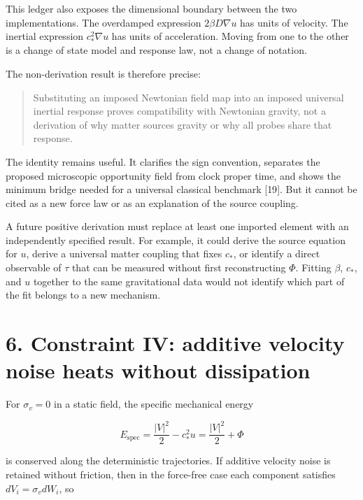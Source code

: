 \documentclass[
  american,
  11pt,
  letterpaper,
]{article}
\begin{document}
This ledger also exposes the dimensional boundary between the two implementations. The overdamped expression \(2\beta D\nabla u\) has units of velocity. The inertial expression \(c_*^2\nabla u\) has units of acceleration. Moving from one to the other is a change of state model and response law, not a change of notation.

The non-derivation result is therefore precise:

\begin{quote}
Substituting an imposed Newtonian field map into an imposed universal inertial response proves compatibility with Newtonian gravity, not a derivation of why matter sources gravity or why all probes share that response.
\end{quote}

The identity remains useful. It clarifies the sign convention, separates the proposed microscopic opportunity field from clock proper time, and shows the minimum bridge needed for a universal classical benchmark {[}19{]}. But it cannot be cited as a new force law or as an explanation of the source coupling.

A future positive derivation must replace at least one imported element with an independently specified result. For example, it could derive the source equation for \(u\), derive a universal matter coupling that fixes \(c_*\), or identify a direct observable of \(\tau\) that can be measured without first reconstructing \(\Phi\). Fitting \(\beta\), \(c_*\), and \(u\) together to the same gravitational data would not identify which part of the fit belongs to a new mechanism.

\section{6. Constraint IV: additive velocity noise heats without dissipation}\label{constraint-iv-additive-velocity-noise-heats-without-dissipation}

For \(\sigma_v=0\) in a static field, the specific mechanical energy

\begin{equation}
E_{\mathrm{spec}}=\frac{|V|^2}{2}-c_*^2u
=\frac{|V|^2}{2}+\Phi
\tag{11}
\end{equation}

is conserved along the deterministic trajectories. If additive velocity noise is retained without friction, then in the force-free case each component satisfies \(dV_i=\sigma_v dW_i\), so
\end{document}
